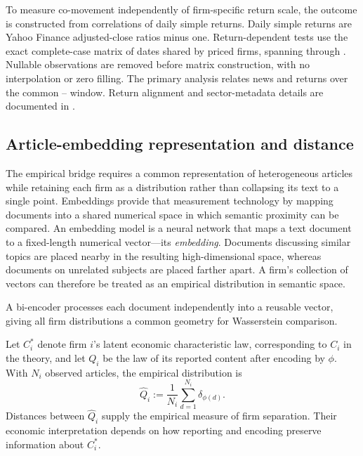 To measure co-movement independently of firm-specific return scale, the
outcome is constructed from correlations of daily simple returns.
Daily simple returns are Yahoo Finance adjusted-close ratios minus one.
Return-dependent tests use the exact complete-case matrix of
 dates shared by
 priced firms, spanning
 through .
Nullable observations are removed before matrix construction, with no
interpolation or zero filling.
The primary analysis relates news and returns over the common
-- window.
Return alignment and sector-metadata details are documented in
.

\subsection{Article-embedding representation and distance}
\label{sec:distance-construction}\label{sec:article-proxy-model}

The empirical bridge requires a common representation of heterogeneous
articles while retaining each firm as a distribution rather than collapsing
its text to a single point.
Embeddings provide that measurement technology by mapping documents into a
shared numerical space in which semantic proximity can be compared.
An embedding model is a neural network that maps a text document to a
fixed-length numerical vector---its \emph{embedding}.
Documents discussing similar topics are placed nearby in the resulting
high-dimensional space, whereas documents on unrelated subjects are placed
farther apart.
A firm's collection of vectors can therefore be treated as an empirical
distribution in semantic space.

A bi-encoder processes each document independently into a reusable vector,
giving all firm distributions a common geometry for Wasserstein comparison.

Let $C_i^\ast$ denote firm $i$'s latent economic characteristic law,
corresponding to $C_i$ in the theory, and let $Q_i$ be the law of its reported
content after encoding by $\phi$.
With $N_i$ observed articles, the empirical distribution is
\begin{equation}\label{eq:empirical-embedding-measure}
  \widehat Q_i
  :=\frac{1}{N_i}\sum_{d=1}^{N_i}\delta_{\phi(d)}.
\end{equation}
Distances between $\widehat Q_i$ supply the empirical measure of firm separation.
Their economic interpretation depends on how reporting and encoding preserve
information about $C_i^\ast$.

